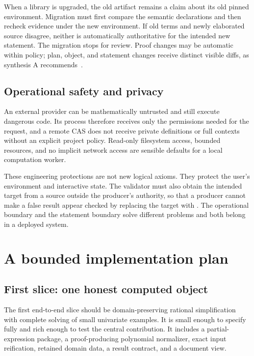 \documentclass[11pt,a4paper]{article}
\newcommand{\code}[1]{\texttt{\detokenize{#1}}}
\theoremstyle{remark}
\begin{document}
When a library is upgraded, the old artifact remains a claim about its old pinned
environment. Migration must first compare the semantic declarations and then
recheck evidence under the new environment. If old terms and newly elaborated
source disagree, neither is automatically authoritative for the intended new
statement. The migration stops for review. Proof changes may be automatic within
policy; plan, object, and statement changes receive distinct visible diffs, as
synthesis A recommends~\cite{synA}.

\subsection{Operational safety and privacy}
An external provider can be mathematically untrusted and still execute dangerous
code. Its process therefore receives only the permissions needed for the request,
and a remote CAS does not receive private definitions or full contexts without
an explicit project policy. Read-only filesystem access, bounded resources, and
no implicit network access are sensible defaults for a local computation worker.

These engineering protections are not new logical axioms. They protect the
user's environment and interactive state. The validator must also obtain the
intended target from a source outside the producer's authority, so that a producer
cannot make a false result appear checked by replacing the target with
\code{True}. The operational boundary and the statement boundary solve different
problems and both belong in a deployed system.

\section{A bounded implementation plan}
\label{sec:plan}
\subsection{First slice: one honest computed object}
The first end-to-end slice should be domain-preserving rational simplification
with complete solving of small univariate examples. It is small enough to
specify fully and rich enough to test the central contribution. It includes a
partial-expression package, a proof-producing polynomial normalizer, exact
input reification, retained domain data, a result contract, and a document view.
\end{document}
